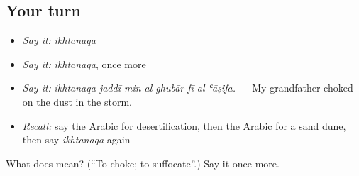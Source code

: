\subsection*{Your turn}
\begin{itemize}
\raggedright
  \item \emph{Say it:} \emph{ikhtanaqa}
  \item \emph{Say it:} \emph{ikhtanaqa}, once more
  \item \emph{Say it:} \emph{ikhtanaqa jaddī min al-ghubār fī al-ʿāṣifa.} — My grandfather choked on the dust in the storm.
  \item \emph{Recall:} say the Arabic for desertification, then the Arabic for a sand dune, then say \emph{ikhtanaqa} again
\end{itemize}

\begin{tcolorbox}[breakable,colback=teal!4,colframe=teal!35!black,title={Before you move on}]
What does  mean? (\textquotedblleft{}To choke; to suffocate\textquotedblright{}.) Say it once more.
\end{tcolorbox}
